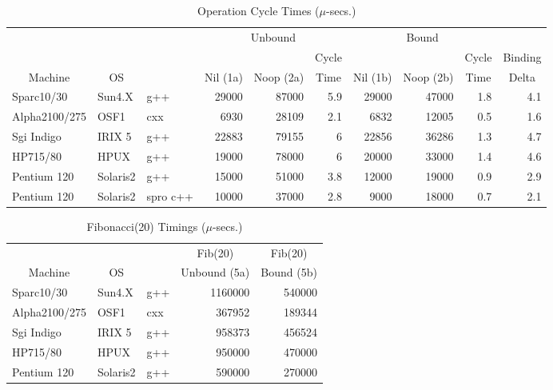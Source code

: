 \begin{table}[p]\centering
\begin{tabular}{|l|l|l|r|r|r|r|r|r|r|}
\hline
\multicolumn{1}{|c}{} &
\multicolumn{1}{|c}{} &
\multicolumn{1}{|c}{} &
\multicolumn{3}{|c}{Unbound} &
\multicolumn{3}{|c}{Bound} &
\multicolumn{1}{|c|}{} \\
\multicolumn{1}{|c}{} &
\multicolumn{1}{|c}{} &
\multicolumn{1}{|c}{} &
\multicolumn{1}{|c}{} &
\multicolumn{1}{c}{} &
\multicolumn{1}{c}{Cycle} &
\multicolumn{1}{|c}{} &
\multicolumn{1}{c}{} &
\multicolumn{1}{c}{Cycle} &
\multicolumn{1}{|c|}{Binding} \\
\multicolumn{1}{|c}{Machine} &
\multicolumn{1}{|c}{OS} &
\multicolumn{1}{|c}{\CC{}} &
\multicolumn{1}{|c}{Nil (1a)} &
\multicolumn{1}{|c}{Noop (2a)} &
\multicolumn{1}{|c}{Time} &
\multicolumn{1}{|c}{Nil (1b)} &
\multicolumn{1}{|c}{Noop (2b)} &
\multicolumn{1}{|c}{Time} &
\multicolumn{1}{|c|}{Delta} \\ \hline\hline
Sparc10/30 & Sun4.X & g++
    & 29000 & 87000 & 5.9 & 29000 & 47000 & 1.8 & 4.1 \\ \hline
Alpha2100/275 & OSF1 & cxx
    & 6930 & 28109 & 2.1 & 6832 & 12005 & 0.5 & 1.6 \\ \hline
Sgi Indigo & IRIX 5 & g++
    & 22883 & 79155 & 6 & 22856 & 36286 & 1.3 & 4.7 \\ \hline
HP715/80 & HPUX & g++
    & 19000 & 78000 & 6 & 20000 & 33000 & 1.4 & 4.6 \\ \hline
Pentium 120 & Solaris2 & g++
    & 15000 & 51000 & 3.8 & 12000 & 19000 & 0.9 & 2.9 \\ \hline
Pentium 120 & Solaris2 & spro c++
    & 10000 & 37000 & 2.8 & 9000 & 18000 & 0.7 & 2.1 \\ \hline
\end{tabular}
\caption{Operation Cycle Times ($\mu$-secs.)}
\label{oct}
\end{table}

\begin{table}[p]\centering
\begin{tabular}{|l|l|l|r|r|}
\hline
\multicolumn{1}{|c}{} &
\multicolumn{1}{|c}{} &
\multicolumn{1}{|c}{} &
\multicolumn{1}{|c}{Fib(20)} &
\multicolumn{1}{|c|}{Fib(20)} \\
\multicolumn{1}{|c}{Machine} &
\multicolumn{1}{|c}{OS} &
\multicolumn{1}{|c}{\CC{}} &
\multicolumn{1}{|c|}{Unbound (5a)} &
\multicolumn{1}{|c|}{Bound (5b)} \\ \hline\hline
Sparc10/30 & Sun4.X & g++ & 1160000 & 540000 \\ \hline
Alpha2100/275 & OSF1 & cxx & 367952 & 189344 \\ \hline
Sgi Indigo & IRIX 5 & g++ & 958373 & 456524 \\ \hline
HP715/80 & HPUX & g++ & 950000 & 470000 \\ \hline
Pentium 120 & Solaris2 & g++ & 590000 & 270000 \\ \hline
\end{tabular}
\caption{Fibonacci(20) Timings ($\mu$-secs.)}
\label{fibperf}
\end{table}

